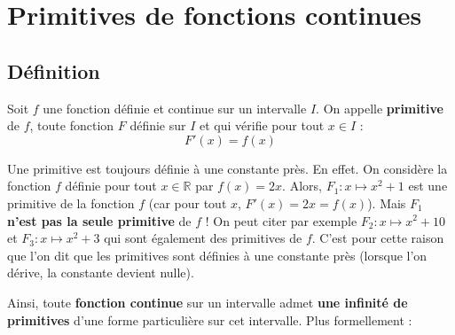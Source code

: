 






	\section{Primitives de fonctions continues}

	\subsection{Définition}

	\begin{formula}[Définition]
		Soit $f$ une fonction définie et continue sur un intervalle $I$. On appelle \textbf{primitive} de $f$, toute fonction $F$ définie sur $I$ et qui vérifie pour tout $x \in I$ :
		\[ F'(x) = f(x) \]
	\end{formula}

	\begin{tip}[Note]
		Une primitive est toujours définie à une constante près.
		\newpar
		En effet. On considère la fonction $f$ définie pour tout $x \in \mathbb{R}$ par $f(x) = 2x$. Alors, $F_{1} : x \mapsto x^2 + 1$ est une primitive de la fonction $f$ (car pour tout $x$, $F'(x) = 2x = f(x)$).
		\newpar
		Mais $F_{1}$ \textbf{n'est pas la seule primitive} de $f$ ! On peut citer par exemple $F_{2} : x \mapsto x^2 + 10$ et $F_{3} : x \mapsto x^2 + 3$ qui sont également des primitives de $f$.
		\newpar
		C'est pour cette raison que l'on dit que les primitives sont définies à une constante près (lorsque l'on dérive, la constante devient nulle).
	\end{tip}

	Ainsi, toute \textbf{fonction continue} sur un intervalle admet \textbf{une infinité de primitives} d'une forme particulière sur cet intervalle. Plus formellement :

